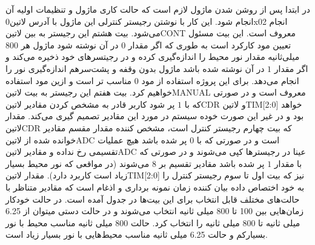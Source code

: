 در ابتدا پس از روشن شدن ماژول لازم است که حالت کاری ماژول و تنظیمات اولیه آن انجام شود. این کار با نوشتن رجیستر کنترلی این ماژول با آدرس ‌لاتین{0x02} انجام می‌شود. بیت هشتم این رجیستر به بین ‌لاتین{CONT} معروف است. این بیت مسئول تعیین مود کارکرد است به طوری که اگر مقدار $0$‍ در آن نوشته شود ماژول هر 800 میلی‌ثانیه مقدار نور محیط را اندازه‌گیری کرده و در رجیتسر‌های خود ذخیره می‌کند و اگر مقدار $1$ در آن نوشته شده باشد ماژول بدون وقفه و پشت‌سر‌هم اندازه‌گیری نور را انجام می‌دهد. برای این پروژه استفاده از مود $0$ مناسب تر است و ازین مود استفاده خواهیم کرد. بیت هفتم این رجیستر به بیت ‌لاتین{MANUAL} معروف است و در صورتی که با $1$ پر شود کاربر قادر به مشخص کردن مقادیر ‌لاتین{CDR} و ‌لاتین{TIM[2:0]} خواهد بود و در غیر این صورت خوده سیستم در مورد این مقادیر تصمیم گیری می‌کند. مقدار ‌لاتین{CDR} که بیت چهارم رجیستر کنترل است، مشخص کننده مقدار مقسم مقادیر خوانده شده از ‌لاتین{ADC} است و در صورتی که با $0$ پر شده باشد هیچ عملیات تقسیمی رخ نداده و مقادیر ‌لاتین{ADC} عینا در رجیستر‌ها کپی می‌شوند و در صورتی که با مقدار $1$ پر شده باشد مقادیر تقسیم بر 8 می‌شوند (در مواقعی که نور محیط بسیار زیاد است کاربرد دارد). مقدار ‌لاتین{TIM[2:0]} نیز که بیت اول تا سوم رجیستر کنترل را به خود اختصاص داده بیان کننده زمان نمونه برداری و اذغام است که مقادیر متناظر با حالت‌های مختلف قابل انتخاب برای این بیت‌ها در جدول  آمده است. در حالت خودکار زمان‌هایی بین 100 تا 800 میلی ثانیه انتخاب می‌شوند و در حالت دستی میتوان از 6.25 میلی ثانیه تا 800 میلی ثانیه را انتخاب کرد. حالت 800 میلی ثانیه مناسب محیط با نور بسیارکم و حالت 6.25 میلی ثانیه مناسب محیط‌هایی با نور بسیار زیاد است. 

